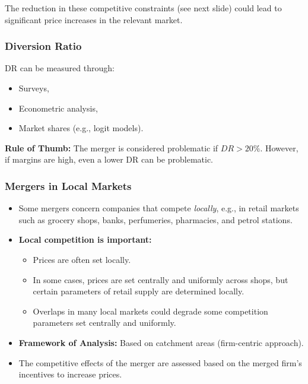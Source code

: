         
        The reduction in these competitive constraints (see next slide) could lead to significant price increases in the relevant market.

        \subsubsection{Diversion Ratio}

    
            DR can be measured through:
            \begin{itemize}
                \item Surveys,
                \item Econometric analysis,
                \item Market shares (e.g., logit models).
            \end{itemize}
            
            \textbf{Rule of Thumb:} The merger is considered problematic if \( DR > 20\% \). However, if margins are high, even a lower DR can be problematic.

        \subsubsection{Mergers in Local Markets}

            \begin{itemize}
                \item Some mergers concern companies that compete \textit{locally}, e.g., in retail markets such as grocery shops, banks, perfumeries, pharmacies, and petrol stations.
                \item \textbf{Local competition is important:}
                \begin{itemize}
                    \item Prices are often set locally.
                    \item In some cases, prices are set centrally and uniformly across shops, but certain parameters of retail supply are determined locally.
                    \item Overlaps in many local markets could degrade some competition parameters set centrally and uniformly.
                \end{itemize}
                \item \textbf{Framework of Analysis:} Based on catchment areas (firm-centric approach).
                \item The competitive effects of the merger are assessed based on the merged firm's incentives to increase prices.
            \end{itemize}

